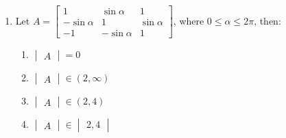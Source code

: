\documentclass{article}
\providecommand{\mydet}[1]{\ensuremath{\begin{vmatrix}#1\end{vmatrix}}}
\providecommand{\myvec}[1]{\ensuremath{\begin{bmatrix}#1\end{bmatrix}}}
\begin{document}
\begin{enumerate}
     \item Let $A = \myvec{1 & \sin\alpha & 1 \\ -\sin\alpha & 1 & \sin\alpha \\ -1 & -\sin\alpha & 1}$, where $0 \leq \alpha \leq 2\pi$, then:
    \begin{enumerate}
        \item $\mydet{A}=0$
        \item $\mydet{A} \in (2,\infty)$
        \item $\mydet{A} \in (2,4)$
        \item $\mydet{A} \in \mydet{2,4}$
    \end{enumerate}
\end{enumerate}
\end{document}
